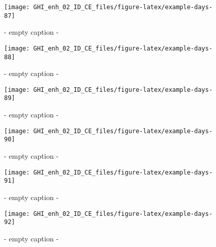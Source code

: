 \documentclass[
  10pt,
  a4paper,oneside]{article}
\begin{document}
\begin{figure}[H]

{\centering \texttt{[image: GHI\_enh\_02\_ID\_CE\_files/figure-latex/example-days-87]} 

}

\caption{ - empty caption - }\label{fig:example-days-87}
\end{figure}

\begin{figure}[H]

{\centering \texttt{[image: GHI\_enh\_02\_ID\_CE\_files/figure-latex/example-days-88]} 

}

\caption{ - empty caption - }\label{fig:example-days-88}
\end{figure}

\begin{figure}[H]

{\centering \texttt{[image: GHI\_enh\_02\_ID\_CE\_files/figure-latex/example-days-89]} 

}

\caption{ - empty caption - }\label{fig:example-days-89}
\end{figure}

\begin{figure}[H]

{\centering \texttt{[image: GHI\_enh\_02\_ID\_CE\_files/figure-latex/example-days-90]} 

}

\caption{ - empty caption - }\label{fig:example-days-90}
\end{figure}

\begin{figure}[H]

{\centering \texttt{[image: GHI\_enh\_02\_ID\_CE\_files/figure-latex/example-days-91]} 

}

\caption{ - empty caption - }\label{fig:example-days-91}
\end{figure}

\begin{figure}[H]

{\centering \texttt{[image: GHI\_enh\_02\_ID\_CE\_files/figure-latex/example-days-92]} 

}

\caption{ - empty caption - }\label{fig:example-days-92}
\end{figure}
\end{document}
